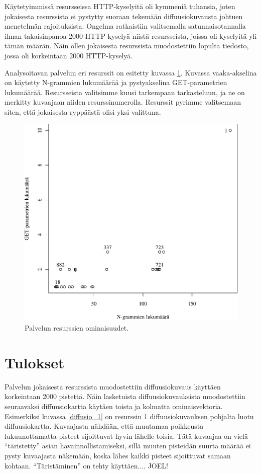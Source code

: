 Käytetyimmissä resursseissa HTTP-kyselyitä oli kymmeniä tuhansia, joten jokaisesta resurssista ei pystytty suoraan tekemään diffuusiokuvausta johtuen
menetelmän rajoituksista. Ongelma ratkaistiin valitsemalla satunnaisotannalla ilman takaisinpanoa 2000 HTTP-kyselyä niistä resursseista, joissa oli 
kyselyitä yli tämän määrän. Näin ollen jokaisesta resurssista muodostettiin lopulta tiedosto, jossa oli korkeintaan 2000 HTTP-kyselyä.

Analysoitavan palvelun eri resurssit on esitetty kuvassa \ref{service_resources}. Kuvassa vaaka-akselina on käytetty N-grammien lukumäärää ja 
pystyakselina GET-parametrien lukumäärää. Resursseista valitsimme kuusi tarkempaan tarkasteluun, ja ne on merkitty kuvaajaan niiden resurssinumerolla. 
Resurssit pyrimme valitsemaan siten, että jokaisesta ryppäästä olisi yksi valittuna.

\begin{figure}[ht]
\centering
\includegraphics[width=13cm]{pics/service_resources.pdf}
\caption{Palvelun resurssien ominaisuudet.}
\label{service_resources}
\end{figure}

\section{Tulokset}

Palvelun jokaisesta resurssista muodostettiin diffuusiokuvaus käyttäen korkeintaan 2000 pistettä. Näin lasketuista diffuusiokuvauksista muodostettiin
seuraavaksi diffuusiokartta käytäen toista ja kolmatta ominaisvektoria. Esimerkiksi kuvassa \ref{diffusio_1} on resurssin 1 diffuusiokuvauksen pohjalta
luotu diffuusiokartta. Kuvaajasta nähdään, että muutamaa poikkeusta lukuunottamatta pisteet sijoittuvat hyvin lähelle toisia. Tätä kuvaajaa on 
vielä ``täristetty'' asian havainnollistamiseksi, sillä muuten pisteidän suurta määrää ei pysty kuvaajasta näkemään, koska lähes kaikki pisteet 
sijoittuvat samaan kohtaan. ``Täristäminen'' on tehty käyttäen.... JOEL!

